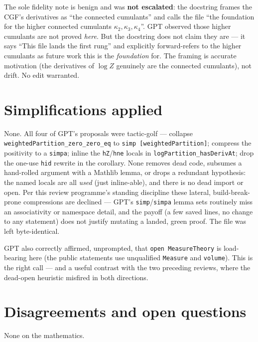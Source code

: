 \documentclass[11pt]{article}
\begin{document}
The sole fidelity note is benign and was \textbf{not escalated}: the docstring frames the CGF's derivatives
as ``the connected cumulants'' and calls the file ``the foundation for the higher connected cumulants
$\kappa_2,\kappa_3,\kappa_4$''. GPT observed those higher cumulants are not proved \emph{here}. But the
docstring does not claim they are --- it says ``This file lands the first rung'' and explicitly forward-refers
to the higher cumulants as future work this is the \emph{foundation} for. The framing is accurate motivation
(the derivatives of $\log Z$ genuinely are the connected cumulants), not drift. No edit warranted.

\section{Simplifications applied}
None. All four of GPT's proposals were tactic-golf --- collapse \texttt{weightedPartition\_zero\_zero\_eq} to
\texttt{simp [weightedPartition]}; compress the positivity to a \texttt{simpa}; inline the \texttt{hZ}/\texttt{hne}
locals in \texttt{logPartition\_hasDerivAt}; drop the one-use \texttt{hid} rewrite in the corollary. None
removes dead code, subsumes a hand-rolled argument with a Mathlib lemma, or drops a redundant hypothesis: the
named locals are all \emph{used} (just inline-able), and there is no dead import or open. Per this review
programme's standing discipline these lateral, build-break-prone compressions are declined --- GPT's
\texttt{simp}/\texttt{simpa} lemma sets routinely miss an associativity or namespace detail, and the payoff
(a few saved lines, no change to any statement) does not justify mutating a landed, green proof. The file was
left byte-identical.

GPT also correctly affirmed, unprompted, that \texttt{open MeasureTheory} is load-bearing here (the public
statements use unqualified \texttt{Measure} and \texttt{volume}). This is the right call --- and a useful
contrast with the two preceding reviews, where the dead-open heuristic misfired in both directions.

\section{Disagreements and open questions}
None on the mathematics.
\end{document}
